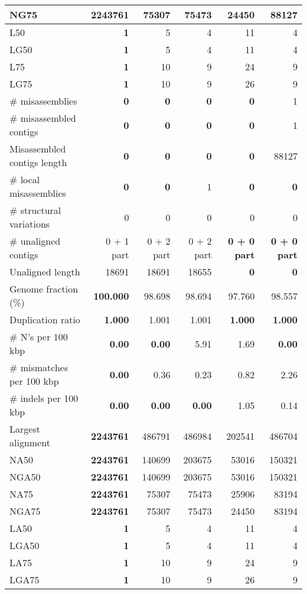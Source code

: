 \documentclass[12pt,a4paper]{article}
\begin{document}
\begin{table}[ht]
\begin{center}
\begin{tabular}{|l*{5}{|r}|}
NG75 & {\bf 2243761} & 75307 & 75473 & 24450 & 88127 \\ \hline
L50 & {\bf 1} & 5 & 4 & 11 & 4 \\ \hline
LG50 & {\bf 1} & 5 & 4 & 11 & 4 \\ \hline
L75 & {\bf 1} & 10 & 9 & 24 & 9 \\ \hline
LG75 & {\bf 1} & 10 & 9 & 26 & 9 \\ \hline
\# misassemblies & {\bf 0} & {\bf 0} & {\bf 0} & {\bf 0} & 1 \\ \hline
\# misassembled contigs & {\bf 0} & {\bf 0} & {\bf 0} & {\bf 0} & 1 \\ \hline
Misassembled contigs length & {\bf 0} & {\bf 0} & {\bf 0} & {\bf 0} & 88127 \\ \hline
\# local misassemblies & {\bf 0} & {\bf 0} & 1 & {\bf 0} & {\bf 0} \\ \hline
\# structural variations & 0 & 0 & 0 & 0 & 0 \\ \hline
\# unaligned contigs & 0 + 1 part & 0 + 2 part & 0 + 2 part & {\bf 0 + 0 part} & {\bf 0 + 0 part} \\ \hline
Unaligned length & 18691 & 18691 & 18655 & {\bf 0} & {\bf 0} \\ \hline
Genome fraction (\%) & {\bf 100.000} & 98.698 & 98.694 & 97.760 & 98.557 \\ \hline
Duplication ratio & {\bf 1.000} & 1.001 & 1.001 & {\bf 1.000} & {\bf 1.000} \\ \hline
\# N's per 100 kbp & {\bf 0.00} & {\bf 0.00} & 5.91 & 1.69 & {\bf 0.00} \\ \hline
\# mismatches per 100 kbp & {\bf 0.00} & 0.36 & 0.23 & 0.82 & 2.26 \\ \hline
\# indels per 100 kbp & {\bf 0.00} & {\bf 0.00} & {\bf 0.00} & 1.05 & 0.14 \\ \hline
Largest alignment & {\bf 2243761} & 486791 & 486984 & 202541 & 486704 \\ \hline
NA50 & {\bf 2243761} & 140699 & 203675 & 53016 & 150321 \\ \hline
NGA50 & {\bf 2243761} & 140699 & 203675 & 53016 & 150321 \\ \hline
NA75 & {\bf 2243761} & 75307 & 75473 & 25906 & 83194 \\ \hline
NGA75 & {\bf 2243761} & 75307 & 75473 & 24450 & 83194 \\ \hline
LA50 & {\bf 1} & 5 & 4 & 11 & 4 \\ \hline
LGA50 & {\bf 1} & 5 & 4 & 11 & 4 \\ \hline
LA75 & {\bf 1} & 10 & 9 & 24 & 9 \\ \hline
LGA75 & {\bf 1} & 10 & 9 & 26 & 9 \\ \hline
\end{tabular}
\end{center}
\end{table}
\end{document}
